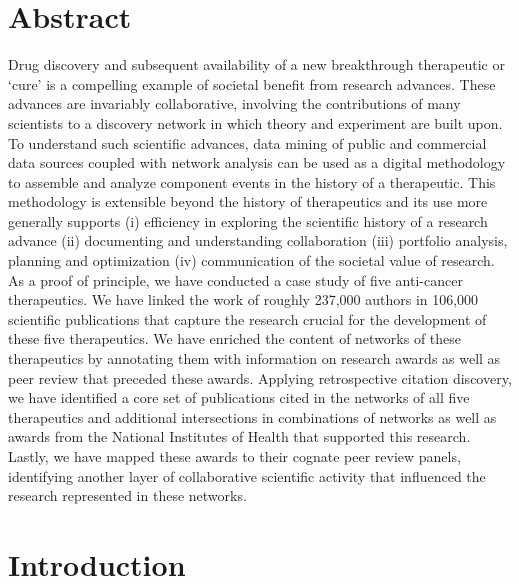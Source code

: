 \documentclass[10pt,letterpaper]{article}
\begin{document}
\section*{Abstract}

Drug discovery and subsequent availability of a new breakthrough therapeutic or `cure' is a compelling example of societal benefit from research advances. These advances are invariably collaborative, involving the contributions of many scientists to a discovery network in which theory and experiment are built upon. To understand such scientific advances, data mining of public and commercial data sources coupled with network analysis can be used as a digital methodology to assemble and analyze component events in the history of a therapeutic. This methodology is extensible beyond the history of therapeutics and its use more generally supports (i) efficiency in  exploring  the scientific history of a research advance (ii) documenting and understanding collaboration (iii) portfolio analysis, planning and optimization (iv) communication of the societal value of research.  As a proof of principle, we have conducted a case study of five anti-cancer therapeutics. We have linked the work of roughly 237,000 authors in 106,000 scientific publications that capture the research crucial for the development of these five therapeutics. We have enriched the content of networks of these therapeutics by annotating them with information on research awards as well as peer review that preceded these awards. Applying retrospective citation discovery, we have identified a core set of publications cited in the networks of all five therapeutics and additional intersections in combinations of networks as well as awards from the National Institutes of Health that supported this research. Lastly, we have mapped these awards to their cognate peer review panels, identifying another layer of collaborative scientific activity that influenced the research represented in these networks. 


\section*{Introduction}
\end{document}
